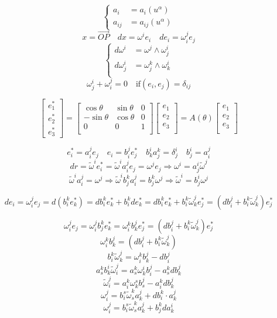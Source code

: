 \documentclass[12pt,a4paper]{article}
\begin{document}
\[
\begin{cases}
a_i & = a_i(u^\alpha) \\
a_{ij} & = a_{ij}(u^\alpha)
\end{cases}
\]
\[
x = \overrightarrow{OP} \quad dx = \omega^ie_i \quad de_i = \omega^j_i e_j
\]
\[
\begin{cases}
d\omega^i &= \omega^j \wedge \omega^i_j \\
d\omega^i_j &= \omega^k_j \wedge \omega^i_k \\
\end{cases}
\]
\[
\omega^i_j + \omega^j_i = 0 \quad \mathrm{if} (e_i,e_j) = \delta_{ij}
\]


\[
\left[
\begin{array}{c}
e^*_1 \\ e^*_2 \\ e^*_3
\end{array}
\right] = \left[
\begin{array}{ccc}
\cos\theta & \sin\theta & 0 \\
-\sin\theta & \cos\theta & 0 \\
0 & 0 & 1 \\
\end{array}
\right] \left[
\begin{array}{c}
e_1\\e_2\\e_3\\
\end{array}
\right] = A(\theta)\left[
\begin{array}{c}
e_1\\e_2\\e_3\\
\end{array}
\right] 
\]

\[
e^*_i = a^j_i e_j \quad e_i = b^j_i e^*_j \quad b^i_ka^k_j = \delta^i_j \quad b^i_j = a^j_i
\]
\[
dr = \tilde{\omega}^ie^*_i = \tilde{\omega}^ia^j_i e_j=\omega^je_j \Rightarrow \omega^i = a^i_j\tilde{\omega}^j
\]
\[
\tilde{\omega}^ia^j_i = \omega^j \Rightarrow \tilde{\omega}^ib^k_ja^j_i = b^k_j\omega^j \Rightarrow \tilde{\omega}^i =  b^i_j\omega^j
\]

\[
de_i = \omega^j_i e_j = d(b^k_ie^*_k) = db^k_i e^*_k + b^k_i de^*_k = db^k_i e^*_k + b^k_i \tilde{\omega}^j_ke^*_j = (db^j_i+ b^k_i \tilde{\omega}^j_k)e^*_j
\]

\[\omega^j_i e_j = \omega^j_i b^k_je^*_k = \omega^k_i b^j_ke^*_j= (db^j_i+ b^k_i \tilde{\omega}^j_k)e^*_j
\]
\[
 \omega^k_i b^j_k= (db^j_i+ b^k_i \tilde{\omega}^j_k)
\]
\[
 b^k_i \tilde{\omega}^j_k = \omega^k_i b^j_k- db^j_i
\]
\[
 a^k_sb^i_k \tilde{\omega}^j_i = a^k_s\omega^i_k b^j_i- a^k_sdb^j_k
\]
\[
\tilde{\omega}^j_i = a^k_i\omega^s_k b^j_s -  a^k_i db^j_k
\]
\[
\omega^j_i =  b^s_i\tilde{\omega}^k_s a^j_k+ db^k_i \cdot a^j_k
\]
\[
\omega^j_i =  b^s_i\tilde{\omega}^k_s a^j_k+  b^k_jda^i_k
\]
\end{document}
